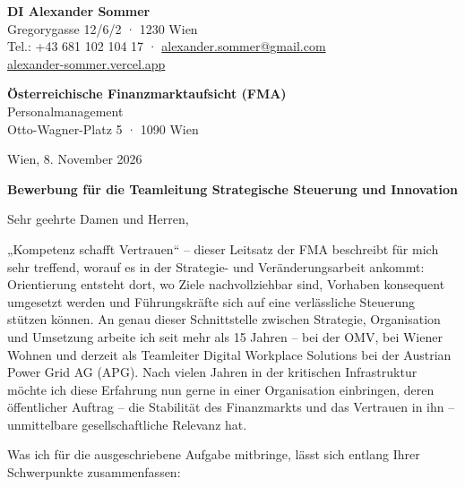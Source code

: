 \documentclass[10.5pt]{article}
\begin{document}
\begin{minipage}[t]{0.56\textwidth}
  \textbf{\color{accent}\large DI Alexander Sommer}\\[1pt]
  Gregorygasse 12/6/2 · 1230 Wien\\[1pt]
  Tel.: +43 681 102 104 17 · \href{mailto:alexander.sommer@gmail.com}{alexander.sommer@gmail.com}\\[1pt]
  \href{https://alexander-sommer.vercel.app}{alexander-sommer.vercel.app}
\end{minipage}\hfill
\begin{minipage}[t]{0.42\textwidth}\raggedleft
  \textbf{Österreichische Finanzmarktaufsicht (FMA)}\\
  Personalmanagement\\
  Otto-Wagner-Platz 5 · 1090 Wien
\end{minipage}

\vspace{8pt}
\hfill Wien, 8. November 2026

\vspace{2pt}
{\large\bfseries\color{brandblue}Bewerbung für die Teamleitung Strategische Steuerung und Innovation}

\vspace{4pt}
Sehr geehrte Damen und Herren,

„Kompetenz schafft Vertrauen“ -- dieser Leitsatz der FMA beschreibt für mich sehr treffend, worauf es in der Strategie- und Veränderungsarbeit ankommt: Orientierung entsteht dort, wo Ziele nachvollziehbar sind, Vorhaben konsequent umgesetzt werden und Führungskräfte sich auf eine verlässliche Steuerung stützen können. An genau dieser Schnittstelle zwischen Strategie, Organisation und Umsetzung arbeite ich seit mehr als 15 Jahren -- bei der OMV, bei Wiener Wohnen und derzeit als Teamleiter Digital Workplace Solutions bei der Austrian Power Grid AG (APG). Nach vielen Jahren in der kritischen Infrastruktur möchte ich diese Erfahrung nun gerne in einer Organisation einbringen, deren öffentlicher Auftrag -- die Stabilität des Finanzmarkts und das Vertrauen in ihn -- unmittelbare gesellschaftliche Relevanz hat.

Was ich für die ausgeschriebene Aufgabe mitbringe, lässt sich entlang Ihrer Schwerpunkte zusammenfassen:
\end{document}
